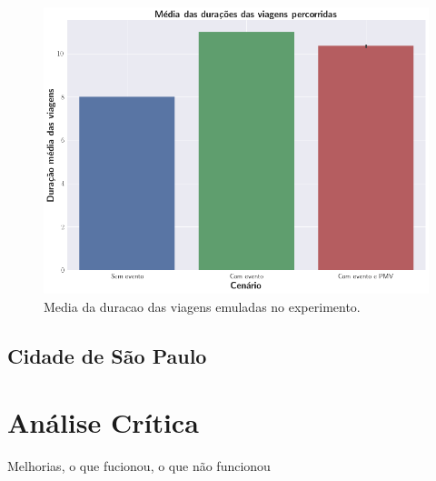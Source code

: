 \begin{figure}[ht]
	\centering
	\includegraphics[width=.8\textwidth]{figuras/duracao_validacao.png}
	\caption{Media da duracao das viagens emuladas no experimento.}
	\label{fig:duracao_validacao}
\end{figure}



\subsection{Cidade de São Paulo}

\section{Análise Crítica}

Melhorias, o que fucionou, o que não funcionou
